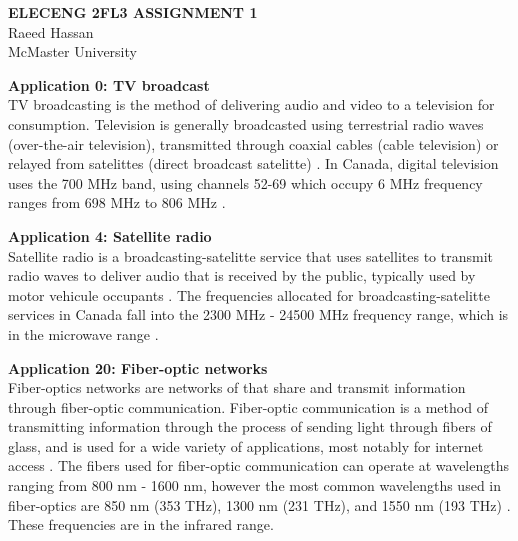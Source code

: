 \documentclass[12pt]{article}
\begin{document}
    \begin{center}
        \textbf{\Large{ELECENG 2FL3 ASSIGNMENT 1}} \\
        \vspace{2mm}
        \large{Raeed Hassan} \\
        McMaster University
    \end{center}
\hrulefill

\textbf{Application 0: TV broadcast} \\
TV broadcasting is the method of delivering audio and video to a television for consumption. Television is generally broadcasted using terrestrial radio waves (over-the-air television), transmitted through coaxial cables (cable television) or relayed from satelittes (direct broadcast satelitte) \cite{1.1}. In Canada, digital television uses the 700 MHz band, using channels 52-69 which occupy 6 MHz frequency ranges from 698 MHz to 806 MHz \cite{1.2}.

\textbf{Application 4: Satellite radio} \\
Satellite radio is a  broadcasting-satelitte service that uses satellites to transmit radio waves to deliver audio that is received by the public, typically used by motor vehicule occupants \cite{2.1}. The frequencies allocated for broadcasting-satelitte services in Canada fall into the 2300 MHz - 24500 MHz frequency range, which is in the microwave range \cite{1.2}.

\textbf{Application 20: Fiber-optic networks} \\ 
Fiber-optics networks are networks of that share and transmit information through fiber-optic communication. Fiber-optic communication is a method of transmitting information through the process of sending light through fibers of glass, and is used for a wide variety of applications, most notably for internet access \cite{3.1}. The fibers used for fiber-optic communication can operate at wavelengths ranging from 800 nm - 1600 nm, however the most common wavelengths used in fiber-optics are 850 nm (353 THz), 1300 nm (231 THz), and 1550 nm (193 THz) \cite{3.2}. These frequencies are in the infrared range.

\medskip
\end{document}
